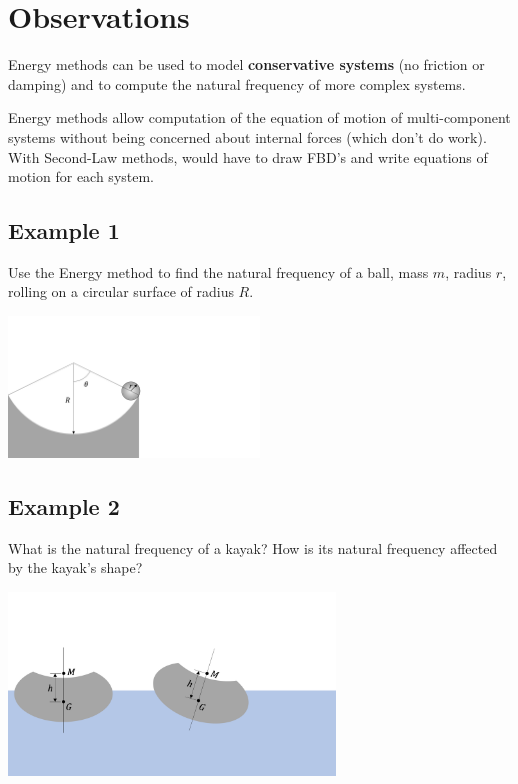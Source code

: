 \documentclass[12pt,letterpaper,twoside]{report}
\begin{document}
\section{Observations}
Energy methods can be used to model \textbf{conservative systems} (no friction or damping) and to compute the natural frequency of more complex systems.  

Energy methods allow computation of the equation of motion of multi-component systems without being concerned about internal forces (which don’t do work).  With Second-Law methods, would have to draw FBD’s and write equations of motion for each system.  

\newpage

\subsection{Example 1}
Use the Energy method to find the natural frequency of a ball, mass $m$, radius $r$, rolling on a circular surface of radius $R$.  

\includegraphics[trim={0cm 2cm 16cm 6cm},clip,width=0.5\textwidth, left]{Slide119}

\vspace*{6\baselineskip}


\newpage

\subsection{Example 2}
What is the natural frequency of a kayak?  How is its natural frequency affected by the kayak's shape?

\includegraphics[trim={0cm 3cm 8cm 5cm},clip,width=0.65\textwidth, left]{Slide120}
\end{document}
